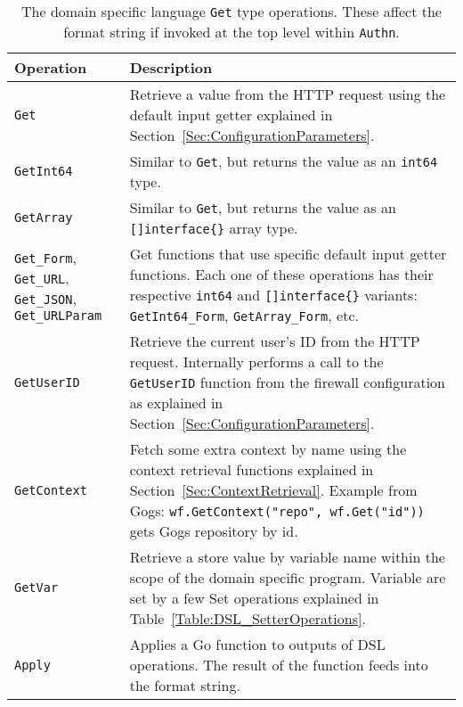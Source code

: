 \begin{table}[h]
\centering

\begin{tabular}{ m{2.5cm} m{11.5cm}  } 
 \hline
 Operation & Description \\ 
 \hline \hline

 \lstinline|Get| & Retrieve a value from the HTTP request using the default input getter explained in Section~\ref{Sec:ConfigurationParameters}. \\ \hline

 \lstinline|GetInt64| & Similar to \lstinline|Get|, but returns the value as an \lstinline|int64| type. \\ \hline

 \lstinline|GetArray| & Similar to \lstinline|Get|, but returns the value as an \lstinline|[]interface{}| array type. \\ \hline

 \lstinline|Get_Form|, \lstinline|Get_URL|, \lstinline|Get_JSON|, \lstinline|Get_URLParam| & Get functions that use specific default input getter functions. Each one of these operations has their respective \lstinline|int64| and \lstinline|[]interface{}| variants: \lstinline|GetInt64_Form|, \lstinline|GetArray_Form|, etc. \\ \hline

 \lstinline|GetUserID| & Retrieve the current user's ID from the HTTP request. Internally performs a call to the \lstinline|GetUserID| function from the firewall configuration as explained in Section~\ref{Sec:ConfigurationParameters}. \\ \hline

 \lstinline|GetContext| & Fetch some extra context by name using the context retrieval functions explained in Section~\ref{Sec:ContextRetrieval}. \newline Example from Gogs: \lstinline|wf.GetContext("repo", wf.Get("id"))| gets Gogs repository by id. \\ \hline

 \lstinline|GetVar| & Retrieve a store value by variable name within the scope of the domain specific program. Variable are set by a few Set operations explained in Table~\ref{Table:DSL_SetterOperations}. \\ \hline

 \lstinline|Apply| & Applies a Go function to outputs of DSL operations. The result of the function feeds into the format string. \\ \hline

\end{tabular}
\caption{The domain specific language \lstinline{Get} type operations. These affect the format string if invoked at the top level within \lstinline|Authn|.}
\label{Table:DSL_GetterOperations}
\end{table}


